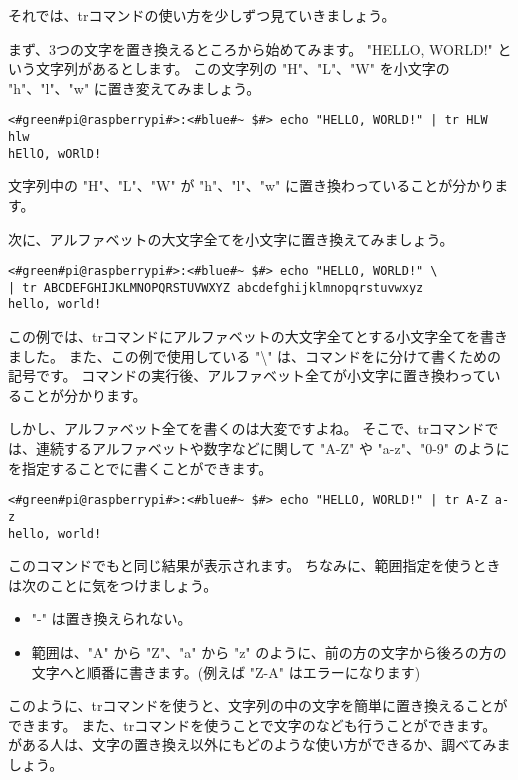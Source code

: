 それでは、trコマンドの使い方を少しずつ見ていきましょう。

まず、3つの文字を置き換えるところから始めてみます。
"HELLO, WORLD!" という文字列があるとします。
この文字列の "H"、"L"、"W" を小文字の "h"、"l"、"w" に置き変えてみましょう。
\begin{lstlisting}[caption=3文字の置き換え, label=tr_3_chars]
<#green#pi@raspberrypi#>:<#blue#~ $#> echo "HELLO, WORLD!" | tr HLW hlw
hEllO, wORlD!
\end{lstlisting}
文字列中の "H"、"L"、"W" が "h"、"l"、"w" に置き換わっていることが分かります。

次に、アルファベットの大文字全てを小文字に置き換えてみましょう。
\begin{lstlisting}[caption=アルファベット全体の置き換え, label=tr_all_chars]
<#green#pi@raspberrypi#>:<#blue#~ $#> echo "HELLO, WORLD!" \
| tr ABCDEFGHIJKLMNOPQRSTUVWXYZ abcdefghijklmnopqrstuvwxyz
hello, world!
\end{lstlisting}
この例では、trコマンドにアルファベットの大文字全てとする小文字全てを書きました。
また、この例で使用している "\textbackslash" は、コマンドをに分けて書くための記号です。
コマンドの実行後、アルファベット全てが小文字に置き換わっていることが分かります。

しかし、アルファベット全てを書くのは大変ですよね。
そこで、trコマンドでは、連続するアルファベットや数字などに関して "A-Z" や "a-z"、"0-9"
のようにを指定することでに書くことができます。

\begin{lstlisting}[caption=範囲指定を使った置き換え, label=tr_range]
<#green#pi@raspberrypi#>:<#blue#~ $#> echo "HELLO, WORLD!" | tr A-Z a-z
hello, world!
\end{lstlisting}
このコマンドでもと同じ結果が表示されます。
ちなみに、範囲指定を使うときは次のことに気をつけましょう。
\begin{itemize}
    \item "-" は置き換えられない。
    \item 範囲は、"A" から "Z"、"a" から "z" のように、前の方の文字から後ろの方の文字へと順番に書きます。(例えば "Z-A"
          はエラーになります)
\end{itemize}
このように、trコマンドを使うと、文字列の中の文字を簡単に置き換えることができます。
また、trコマンドを使うことで文字のなども行うことができます。
がある人は、文字の置き換え以外にもどのような使い方ができるか、調べてみましょう。

